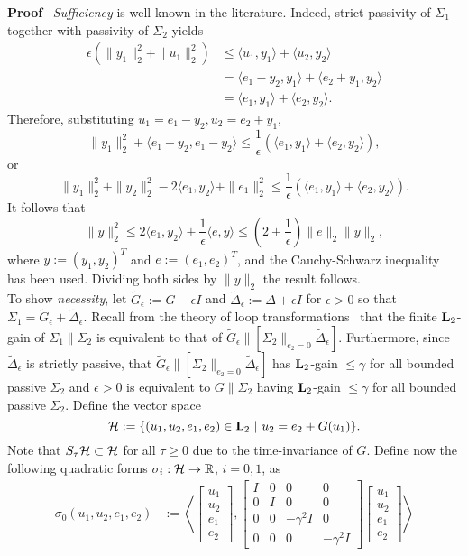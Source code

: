 \documentclass[11pt]{article}
\def\Real{\mathbb{R}} \def\Ints{\mathbb{Z}} \def\Natural{\mathbb{N}}
\newcommand{\Ltwo}{\boldsymbol{\rm L}_{2}}
\begin{document}
\noindent
{\bf Proof} \,
{\it Sufficiency} is well known in the literature. Indeed, strict passivity of $\Sigma_1$ together with passivity of $\Sigma_2$ yields
\begin{align*}
\epsilon (\|y_1\|_2^2 + \|u_1\|_2^2) & \leq \langle u_1, y_1 \rangle + \langle u_2, y_2 \rangle \\
& = \langle e_1 - y_2, y_1 \rangle + \langle e_2 + y_1, y_2 \rangle \\
& = \langle e_1, y_1 \rangle + \langle e_2, y_2 \rangle.
\end{align*}
Therefore, substituting $u_1=e_1-y_2, u_2=e_2+y_1$,
\[
\|y_1\|_2^2 + \langle e_1 - y_2, e_1 - y_2 \rangle \leq \frac{1}{\epsilon} (\langle e_1, y_1 \rangle + \langle e_2, y_2 \rangle),
\]
or
\[
\|y_1\|_2^2 + \|y_2\|_2^2 -2 \langle e_1, y_2 \rangle + \|e_1\|_2^2 \leq \frac{1}{\epsilon} (\langle e_1, y_1 \rangle + \langle e_2, y_2 \rangle).
\]
It follows that
\[
\|y\|_2^2 \leq 2 \langle e_1, y_2 \rangle + \frac{1}{\epsilon} \langle e, y \rangle \leq \left(2 + \frac{1}{\epsilon}\right) \|e\|_2\|y\|_2,
\]
where $y := (y_1, y_2)^T$ and $e := (e_1, e_2)^T$, and the Cauchy-Schwarz inequality has been used. Dividing both sides by $\|y\|_2$ the result follows.\\
To show {\it necessity}, let $\tilde{G}_\epsilon := G - \epsilon I$ and $\tilde{\Delta}_\epsilon := \Delta + \epsilon I$ for $\epsilon > 0$ so that
$\Sigma_1 = \tilde{G}_\epsilon + \tilde{\Delta}_\epsilon$. Recall from the theory of loop transformations~\cite[Section 3.5]{GreLim95} that the
finite $\Ltwo$-gain of $\Sigma_1 \| \Sigma_2$ is equivalent to that of $\tilde{G}_\epsilon\| [\Sigma_2 \|_{e_2 = 0} \tilde{\Delta}_\epsilon]$.
Furthermore, since $\tilde{\Delta}_\epsilon$ is strictly passive, that $\tilde{G}_\epsilon \| [\Sigma_2 \|_{e_2 = 0} \tilde{\Delta}_\epsilon]$ has
$\Ltwo$-gain $\leq \gamma$ for all bounded passive $\Sigma_2$ and $\epsilon > 0$ is equivalent to $G \| \Sigma_2$ having $\Ltwo$-gain $\leq \gamma$
for all bounded passive $\Sigma_2$. Define the vector space
\[
\HH := \{(u_1, u_2, e_1, e_2) \in \Ltwo\ |\ u_2 = e_2 + G (u_1)\}.
\]
Note that $S_\tau \mathcal{H} \subset \mathcal{H}$ for all $\tau \geq 0$ due to the time-invariance of $G$. 
Define now the following quadratic forms $\sigma_i : \HH
\to \Real$, $i = 0, 1$, as 
\begin{align*}
 \sigma_0(u_1, u_2, e_1, e_2) & := \left\langle 
\begin{bmatrix} 
 u_1 \\
 u_2 \\
 e_1 \\
 e_2
\end{bmatrix},
\begin{bmatrix}
I & 0 & 0 & 0 \\
0 & I & 0 & 0 \\
0 & 0 & -\gamma^2 I & 0 \\
0 & 0 & 0 & -\gamma^2 I
\end{bmatrix}
\begin{bmatrix} 
 u_1 \\
 u_2 \\
 e_1 \\
 e_2
\end{bmatrix}
\right\rangle 
\end{align*}
\end{document}
